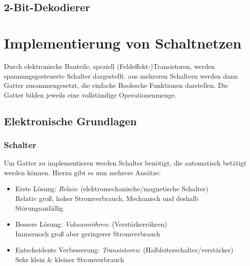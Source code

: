 \documentclass[12pt]{report}
\begin{document}
\subsection{2-Bit-Dekodierer}



\section{Implementierung von Schaltnetzen}
\begin{defbox}
  Durch elektronische Bauteile, speziell (Feldeffekt-)Transistoren, werden spannungsgesteuerte Schalter dargestellt.
  aus mehreren Schaltern werden dann Gatter zusammengesetzt, die einfache Boolesche Funktionen darstellen.
  Die Gatter bilden jeweils eine vollständige Operationenmenge.
\end{defbox}

\subsection{Elektronische Grundlagen}
\subsubsection{Schalter}
Um Gatter zu implementieren werden Schalter benötigt, die automatisch betätigt werden können. Hierzu gibt es nun mehrere Ansätze:
\begin{itemize}
  \item Erste Lösung: \textit{Relais}: (elektromechanische/magnetische
        Schalter)\\
        Relativ groß, hoher Stromverbrauch, Mechanisch und deshalb Störungsanfällig
        
  \item Bessere Lösung: \textit{Vakuumröhren}: (Verstärkerröhren) \\
        Immernoch groß aber geringerer Stromverbrauch
        
  \item Entscheidente Verbesserung: \textit{Transistoren}: (Halbleiterschalter/verstärker) \\
        Sehr klein \& kleiner Stromverbrauch
        
\end{itemize}
\end{document}
